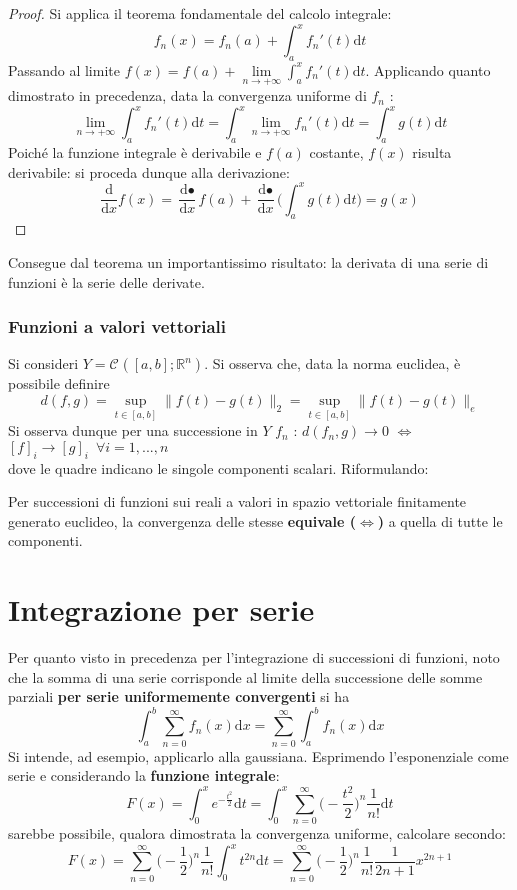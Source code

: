 \documentclass[10pt, oneside]{book}
\theoremstyle{plain}
\begin{document}
\begin{proof}
Si applica il teorema fondamentale del calcolo integrale:
\[f_n(x) = f_n(a) + \int_{a}^{x}f_n'(t)\textrm{d}t\]
Passando al limite $\displaystyle f(x) = f(a) + \lim\limits_{n \rightarrow +\infty}\int_{a}^{x}f_n'(t)\textrm{d}t$. Applicando quanto dimostrato in precedenza, data la convergenza uniforme di $f_n$ :
\[\lim\limits_{n \rightarrow +\infty}\int_{a}^{x}f_n'(t)\textrm{d}t = \int_{a}^{x} \lim\limits_{n \rightarrow +\infty}f_n'(t)\textrm{d}t = \int_{a}^{x}g(t)\textrm{d}t\]
Poiché la funzione integrale è derivabile e $f(a)$ costante, $f(x)$ risulta derivabile: si proceda dunque alla derivazione:
\[\frac{\textrm{d}}{\textrm{d}x}f(x) = \frac{\textrm{d} •}{\textrm{d}x}f(a) + \frac{\textrm{d} •}{\textrm{d}x}\bigg(\int_{a}^{x}g(t)\textrm{d}t\bigg) = g(x)\]
\end{proof}

Consegue dal teorema un importantissimo risultato: la derivata di una serie di funzioni è la serie delle derivate.

\subsubsection{Funzioni a valori vettoriali}
Si consideri $Y = \mathcal{C}^{}([a,b] ; \mathbb{R}^n)$. Si osserva che, data la norma euclidea, è possibile definire
\[d(f,g) = \sup\limits_{t \in [a,b]} \|f(t) - g(t)\|_2 = \sup\limits_{t \in [a,b]} \|f(t) - g(t)\|_e\]
Si osserva dunque per una successione in $Y$ $f_n$ : $d(f_n , g) \rightarrow 0$ $\Leftrightarrow$ $[f]_i \rightarrow [g]_i \enspace \forall i = 1, ..., n$
\\dove le quadre indicano le singole componenti scalari. Riformulando:
\begin{oss}
Per successioni di funzioni sui reali a valori in spazio vettoriale finitamente generato euclideo, la convergenza delle stesse \textbf{equivale ($\mathbf{\Leftrightarrow}$)} a quella di tutte le componenti.
\end{oss}

\section{Integrazione per serie}
Per quanto visto in precedenza per l'integrazione di successioni di funzioni, noto che la somma di una serie corrisponde al limite della successione delle somme parziali \textbf{per serie uniformemente convergenti} si ha
\[\int_{a}^{b}\sum\limits_{n=0}^\infty f_n(x)\textrm{d}x = \sum\limits_{n=0}^\infty \int_{a}^{b}f_n(x)\textrm{d}x\]
Si intende, ad esempio, applicarlo alla gaussiana. Esprimendo l'esponenziale come serie e considerando la \textbf{funzione integrale}:
\[F(x) = \int_{0}^{x}e^{\displaystyle -\frac{t^2}{2}}\textrm{d}t = \int_{0}^{x}\sum\limits_{n=0}^\infty\big( - \frac{t^2}{2}\big)^n\frac{1}{n!}\textrm{d}t\]
sarebbe possibile, qualora dimostrata la convergenza uniforme, calcolare secondo:
\[F(x) = \sum\limits_{n=0}^\infty \big( - \frac{1}{2}\big)^n\frac{1}{n!}\int_{0}^{x}t^{2n}\textrm{d}t = \sum\limits_{n=0}^\infty \big( - \frac{1}{2}\big)^n\frac{1}{n!}\frac{1}{2n + 1}x^{2n + 1}\]
\end{document}
